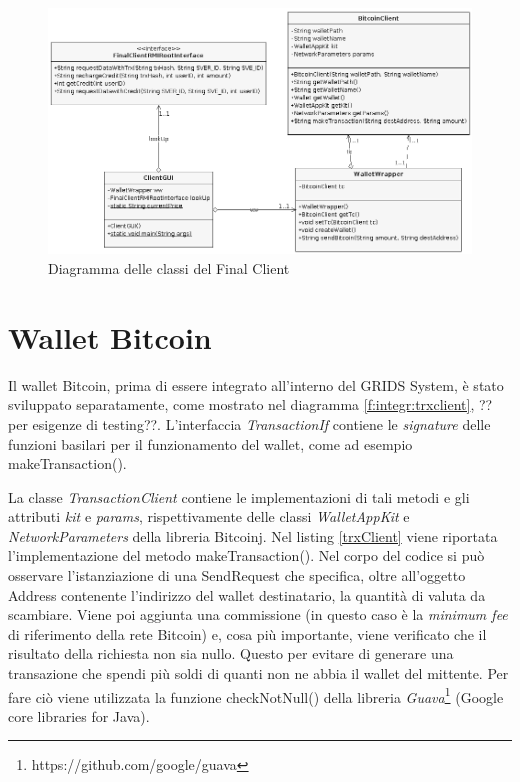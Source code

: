 \begin{figure}[h!t]
\centerline{\includegraphics[width=\textwidth]{img/finalClientCorrect}}
\caption{Diagramma delle classi del Final Client}
\label{f:integr:final-client-diagram}
\end{figure}


\section{Wallet Bitcoin}
\label{c:integr:wallet}

Il wallet Bitcoin, prima di essere integrato all'interno del GRIDS System, è stato sviluppato separatamente, come mostrato nel diagramma \ref{f:integr:trxclient}, ??per esigenze di testing??. L'interfaccia \textit{TransactionIf} contiene le \textit{signature} delle funzioni basilari per il funzionamento del wallet, come ad esempio makeTransaction(). 

La classe \textit{TransactionClient} contiene le implementazioni di tali metodi e gli attributi \textit{kit} e \textit{params}, rispettivamente delle classi \textit{WalletAppKit} e \textit{NetworkParameters} della libreria Bitcoinj. Nel listing \ref{trxClient} viene riportata l'implementazione del metodo makeTransaction(). Nel corpo del codice si può osservare l'istanziazione di una SendRequest che specifica, oltre all'oggetto Address contenente l'indirizzo del wallet destinatario, la quantità di valuta da scambiare. Viene poi aggiunta una commissione (in questo caso è la \textit{minimum fee} di riferimento della rete Bitcoin) e, cosa più importante, viene verificato che il risultato della richiesta non sia nullo. Questo per evitare di generare una transazione che spendi più soldi di quanti non ne abbia il wallet del mittente. Per fare ciò viene utilizzata la funzione checkNotNull() della libreria \textit{Guava}\footnote{https://github.com/google/guava} (Google core libraries for Java).

